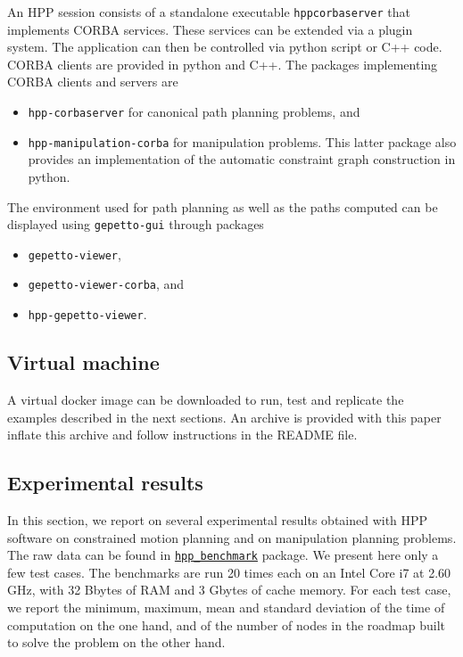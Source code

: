 An HPP session consists of a standalone executable \texttt{hppcorbaserver}
that implements CORBA services. These services can be extended via a plugin
system. The application can then be controlled via python script or C++ code.
CORBA clients are provided in python and C++. The packages implementing CORBA
clients and servers are
\begin{itemize}
\item \texttt{hpp-corbaserver} for canonical path planning problems, and
\item \texttt{hpp-manipulation-corba} for manipulation problems. This
latter package also provides an implementation of the automatic constraint graph
construction in python.
\end{itemize}
The environment used for path planning as well as the paths computed can be
displayed using \texttt{gepetto-gui} through packages
\begin{itemize}
  \item\texttt{gepetto-viewer},
  \item\texttt{gepetto-viewer-corba}, and
  \item\texttt{hpp-gepetto-viewer}.
\end{itemize}

\subsection{Virtual machine}

A virtual docker image can be downloaded to run, test and replicate the
examples described in the next sections. An archive is provided with this paper
inflate this archive and follow instructions in the README file.

\subsection{Experimental results}\label{sec:benchmarks}

In this section, we report on several experimental results obtained
with HPP software on constrained motion planning and on manipulation
planning problems. The raw data can be found in
\href{https://github.com/humanoid-path-planner/hpp_benchmark/tree/v4.10.0/2020-07-23}{\texttt{hpp\_benchmark}} package. We present here only a few test cases.
The benchmarks are run 20 times each on an Intel Core i7 at 2.60 GHz, with 32 Bbytes of RAM and 3 Gbytes of cache memory. For each test case, we report the minimum, maximum, mean and standard deviation of the time of computation on the one hand, and of the number of nodes in the roadmap built to solve the problem on the other hand.

